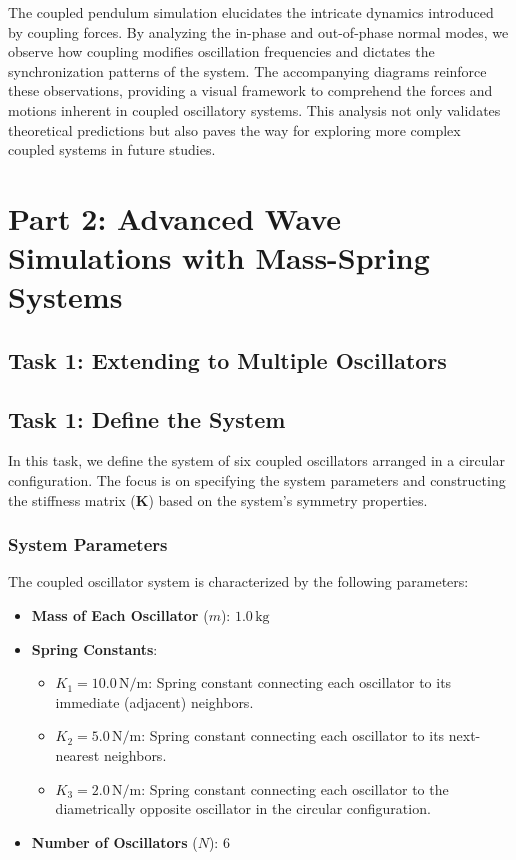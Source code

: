 \documentclass[12pt]{report} %
\begin{document}
The coupled pendulum simulation elucidates the intricate dynamics introduced by coupling forces. By analyzing the in-phase and out-of-phase normal modes, we observe how coupling modifies oscillation frequencies and dictates the synchronization patterns of the system. The accompanying diagrams reinforce these observations, providing a visual framework to comprehend the forces and motions inherent in coupled oscillatory systems. This analysis not only validates theoretical predictions but also paves the way for exploring more complex coupled systems in future studies.

\newpage


\chapter{Part 2: Advanced Wave Simulations with Mass-Spring Systems}
\label{chap:part2}

\section{Task 1: Extending to Multiple Oscillators}
\label{sec:part2_task1}

    \section{Task 1: Define the System}
    \label{sec:part2_task1}
    
    In this task, we define the system of six coupled oscillators arranged in a circular configuration. The focus is on specifying the system parameters and constructing the stiffness matrix (\( \mathbf{K} \)) based on the system's symmetry properties.
    
    \subsection{System Parameters}
    \label{subsec:part2_task1_parameters}
    
    The coupled oscillator system is characterized by the following parameters:
    
    \begin{itemize}
        \item \textbf{Mass of Each Oscillator} (\( m \)): \( 1.0 \, \text{kg} \)
        \item \textbf{Spring Constants}:
        \begin{itemize}
            \item \( K_1 = 10.0 \, \text{N/m} \): Spring constant connecting each oscillator to its immediate (adjacent) neighbors.
            \item \( K_2 = 5.0 \, \text{N/m} \): Spring constant connecting each oscillator to its next-nearest neighbors.
            \item \( K_3 = 2.0 \, \text{N/m} \): Spring constant connecting each oscillator to the diametrically opposite oscillator in the circular configuration.
        \end{itemize}
        \item \textbf{Number of Oscillators} (\( N \)): \( 6 \)
    \end{itemize}
    
\end{document}
